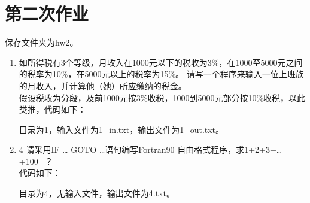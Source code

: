 \documentclass{ctexart}
\begin{document}
\section{第二次作业}

    保存文件夹为hw2。
    
    \begin{enumerate}

        \item
            如所得税有3个等级，月收入在1000元以下的税收为3\%，在1000至5000元之间的税率为10\%，在5000元以上的税率为15\%。
            请写一个程序来输入一位上班族的月收入，并计算他（她）所应缴纳的税金。\\

            假设税收为分段，及前1000元按3\%收税，1000到5000元部分按10\%收税，以此类推，代码如下：
            

            目录为1，输入文件为1\_in.txt，输出文件为1\_out.txt。

        \item{4}
            请采用IF … GOTO …语句编写Fortran90 自由格式程序，求1+2+3+…+100=？\\

            代码如下：
            

            目录为4，无输入文件，输出文件为4.txt。

    \end{enumerate}
\end{document}

